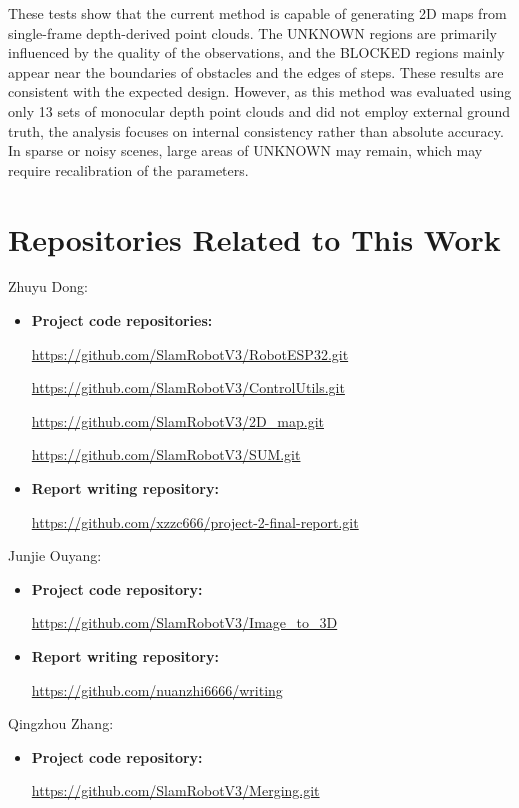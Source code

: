 \documentclass[12pt]{interim_report}
\begin{document}
These tests show that the current method is capable of generating 2D maps from single-frame depth-derived point clouds. The UNKNOWN regions are primarily influenced by the quality of the observations, and the BLOCKED regions mainly appear near the boundaries of obstacles and the edges of steps. These results are consistent with the expected design. However, as this method was evaluated using only 13 sets of monocular depth point clouds and did not employ external ground truth, the analysis focuses on internal consistency rather than absolute accuracy. In sparse or noisy scenes, large areas of UNKNOWN may remain, which may require recalibration of the parameters.



\section{Repositories Related to This Work}

Zhuyu Dong:
\begin{itemize}
    \item \textbf{Project code repositories:}
    
    \url{https://github.com/SlamRobotV3/RobotESP32.git}
    
    \url{https://github.com/SlamRobotV3/ControlUtils.git}
    
    \url{https://github.com/SlamRobotV3/2D_map.git}

    \url{https://github.com/SlamRobotV3/SUM.git}
    
    \item \textbf{Report writing repository:}
    
    \url{https://github.com/xzzc666/project-2-final-report.git}
\end{itemize}

Junjie Ouyang:
\begin{itemize}
    \item \textbf{Project code repository:}
    
    \url{https://github.com/SlamRobotV3/Image_to_3D}
    
    \item \textbf{Report writing repository:}
    
    \url{https://github.com/nuanzhi6666/writing}
\end{itemize}

Qingzhou Zhang:
\begin{itemize}
    \item \textbf{Project code repository:}
    
    \url{https://github.com/SlamRobotV3/Merging.git}
\end{itemize}
\end{document}
